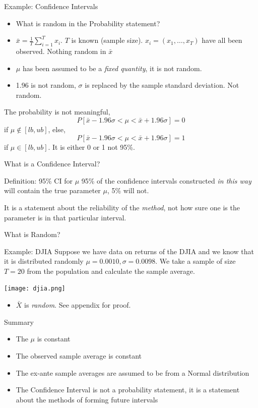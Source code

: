 \documentclass[table]{beamer}
\begin{document}
\begin{frame}{Example: Confidence Intervals}
	\begin{itemize}
		\item What is random in the Probability statement?
		\item $ \bar{x} = \frac{1}{T} \sum_{i=1}^{T} x_i $. $ T $ is known (sample size). $ x_i = (x_1, \dots, x_T) $ have all been observed. Nothing random in $ \bar{x} $
		\item $ \mu $ has been assumed to be a \textit{fixed quantity}, it is not random. 
		\item 1.96 is not random, $ \sigma $ is replaced by the sample standard deviation. Not random.
	\end{itemize} 
		The probability is not meaningful, 
		\[ P[ \bar{x} - 1.96\sigma < \mu < \bar{x} + 1.96\sigma ] = 0 \] if $ \mu \notin [lb, ub] $, else, 
		\[ P[ \bar{x} - 1.96\sigma < \mu < \bar{x} + 1.96\sigma ] = 1 \]
		if $ \mu \in [lb, ub] $. It is either 0 or 1 not 95\%.
\end{frame}

\begin{frame}{What is a Confidence Interval?}
	\begin{block}{Definition: 95\% CI for $ \mu $}
	95\% of the confidence intervals constructed \textit{in this way} will contain the true parameter $ \mu $, 5\% will not.
	\end{block}
	It is a statement about the reliability of the \textit{method}, not how sure one is the parameter is in that particular interval.
\end{frame}

\begin{frame}{What is Random?}
	\begin{block}{Example: DJIA}
		Suppose we have data on returns of the DJIA and we know that it is distributed randomly $ \mu = 0.0010, \sigma = 0.0098 $. We take a sample of size $ T = 20 $ from the population and calculate the sample average. 
	\end{block}
	\begin{center}
		\texttt{[image: djia.png]}
	\end{center}
	\begin{itemize}
		\item $ \bar{X} $ is \textit{random}. See appendix for proof.
	\end{itemize}
\end{frame}


\begin{frame}{Summary}
	\begin{itemize}
		\item The $ \mu $ is constant
		\item The observed sample average is constant
		\item The ex-ante sample averages are assumed to be from a Normal distribution
		\item The Confidence Interval is not a probability statement, it is a statement about the methods of forming future intervals
	\end{itemize}
\end{frame}
\end{document}
